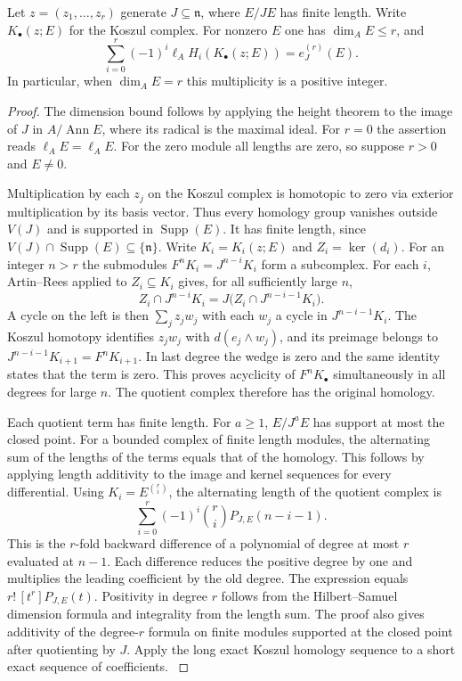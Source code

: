 \begin{theorem}\label{res:I05}
Let \(z=(z_1,\ldots,z_r)\) generate \(J\subseteq\mathfrak n\), where
\(E/JE\) has finite length. Write \(K_\bullet(z;E)\) for the Koszul
complex. For nonzero \(E\) one has \(\dim_A E\le r\), and
\[
 \sum_{i=0}^r(-1)^i\ell_A H_i(K_\bullet(z;E))=e^{(r)}_J(E).
\]
In particular, when \(\dim_A E=r\) this multiplicity is a positive
integer.
\end{theorem}
\begin{proof}
The dimension bound follows by applying the height theorem to the
image of \(J\) in \(A/\operatorname{Ann} E\), where its radical is
the maximal ideal.
\cite[ALG-05-C03-R01 and ALG-05-C03-S01]{p103}
For \(r=0\) the assertion reads \(\ell_A E=\ell_A E\). For the zero
module all lengths are zero, so suppose \(r>0\) and \(E\ne 0\).

Multiplication by each \(z_j\) on the Koszul complex is homotopic to
zero via exterior multiplication by its basis vector. Thus every
homology group vanishes outside \(V(J)\) and is supported in
\(\operatorname{Supp}(E)\). It has finite length, since
\(V(J)\cap\operatorname{Supp}(E)\subseteq\{\mathfrak n\}\).
Write \(K_i=K_i(z;E)\) and \(Z_i=\ker(d_i)\). For an integer \(n>r\)
the submodules \(F^nK_i=J^{n-i}K_i\) form a subcomplex. For each \(i\),
Artin--Rees applied to \(Z_i\subseteq K_i\) gives, for all sufficiently
large \(n\),
\[
 Z_i\cap J^{n-i}K_i
     =J\bigl(Z_i\cap J^{n-i-1}K_i\bigr).
\]
A cycle on the left is then \(\sum_j z_j w_j\) with each \(w_j\)
a cycle in \(J^{n-i-1}K_i\). The Koszul homotopy identifies \(z_jw_j\)
with \(d(e_j\wedge w_j)\), and its preimage belongs to
\(J^{n-i-1}K_{i+1}=F^nK_{i+1}\). In last degree the wedge is zero
and the same identity states that the term is zero. This proves
acyclicity of \(F^nK_\bullet\) simultaneously in all degrees for
large \(n\). The quotient complex therefore has the original
homology.

Each quotient term has finite length. For \(a\ge 1\),
\(E/J^aE\) has support at most the closed point. For a bounded complex
of finite length modules, the alternating sum of the lengths of
the terms equals that of the homology. This follows by applying
length additivity to the image and kernel sequences for every
differential. Using \(K_i=E^{\binom ri}\), the alternating length
of the quotient complex is
\[
 \sum_{i=0}^r(-1)^i\binom ri P_{J,E}(n-i-1).
\]
This is the \(r\)-fold backward difference of a polynomial of degree
at most \(r\) evaluated at \(n-1\). Each difference reduces the
positive degree by one and multiplies the leading coefficient by
the old degree. The expression equals \(r!\,[t^r]P_{J,E}(t)\).
Positivity in degree \(r\) follows from the Hilbert--Samuel dimension
formula and integrality from the length sum. The proof also gives
additivity of the degree-\(r\) formula on finite modules supported
at the closed point after quotienting by \(J\). Apply the long exact
Koszul homology sequence to a short exact sequence of coefficients.
\cite[Chapter IV, \S A.3]{serre-local}
\end{proof}

